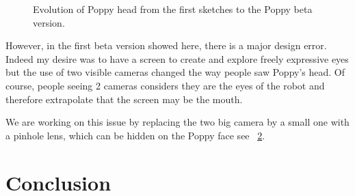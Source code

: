 
\begin{figure}[p]
\centering
    \hfil
    \newline
    \hfil
    \newline
    \hfil
    \hfil
    \caption{Evolution of Poppy head from the first sketches to the Poppy beta version.}
    \label{fig:head_sketch}
\end{figure}


However, in the first beta version showed here, there is a major design error. Indeed my desire was to have a screen to create and explore freely expressive eyes but the use of two visible cameras changed the way people saw Poppy's head. Of course, people seeing 2 cameras considers they are the eyes of the robot and therefore extrapolate that the screen may be the mouth.

We are working on this issue by replacing the two big camera by a small one with a pinhole lens, which can be hidden on the Poppy face see \figurename~\ref{fig:poppy_head_v1}.

\begin{figure}[]
\centering
    \caption{}
    \label{fig:poppy_head_v1}
\end{figure}




\section{Conclusion} %


